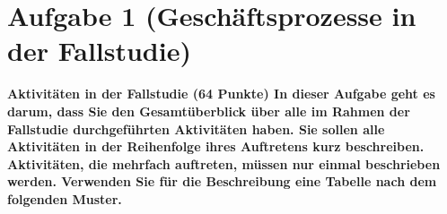 \section{Aufgabe 1 (Geschäftsprozesse in der Fallstudie)}
\textbf{Aktivitäten in der Fallstudie (64 Punkte) In dieser Aufgabe geht es
darum, dass Sie den Gesamtüberblick über alle im Rahmen der Fallstudie
durchgeführten Aktivitäten haben. Sie sollen alle Aktivitäten in der Reihenfolge
ihres Auftretens kurz beschreiben. Aktivitäten, die mehrfach auftreten, müssen
nur einmal beschrieben werden. Verwenden Sie für die Beschreibung eine Tabelle
nach dem folgenden Muster.}

\clearpage
{}
\clearpage 